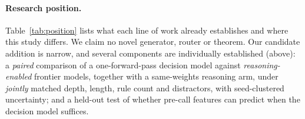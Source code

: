\paragraph{Research position.}
Table~\ref{tab:position} lists what each line of work already establishes and where this study differs.
We claim no novel generator, router or theorem.
Our candidate addition is narrow, and several components are individually established (above): a \emph{paired} comparison of a one-forward-pass decision model against \emph{reasoning-enabled} frontier models, together with a same-weights reasoning arm, under \emph{jointly} matched depth, length, rule count and distractors, with seed-clustered uncertainty; and a held-out test of whether pre-call features can predict when the decision model suffices.


